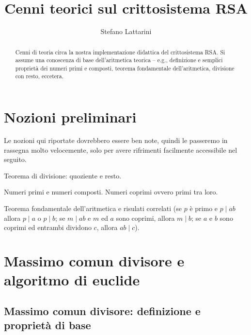 \documentclass[pdflatex,11pt,a4paper,oneside]{article}
\newcommand{\theauthor}[0]{Stefano Lattarini}
\newcommand{\thetitle}[0]{Cenni teorici sul crittosistema RSA}
\newcommand{\divides}[0]{\mid}
\begin{document}
\title{\thetitle}
\author{\theauthor}

\maketitle


\begin{abstract}
  Cenni di teoria circa la nostra implementazione didattica del
  crittosistema RSA.  Si assume una conoscenza di base dell'aritmetica
  teorica -- e.g., definizione e semplici propriet\`a dei numeri primi
  e composti, teorema fondamentale dell'aritmetica, divisione con resto,
  eccetera.
\end{abstract}


\section{Nozioni preliminari}

Le nozioni qui riportate dovrebbero essere ben note, quindi le
passeremo in rassegna molto velocemente, solo per avere rifrimenti
facilmente accessibile nel seguito.

Teorema di divisione: quoziente e resto.

Numeri primi e numeri composti.  Numeri coprimi ovvero primi tra loro.

Teorema fondamentale dell'aritmetica e risulati correlati (se $p$ \`e
primo e $p \divides ab$ allora $p \divides a$ o $p \divides b$; se
$m \divides ab$ e $m$ ed $a$ sono coprimi, allora $m \divides b$; se
$a$ e $b$ sono coprimi ed entrambi dividono $c$, allora $ab \divides c$).


\section{Massimo comun divisore e algoritmo di euclide}


\subsection{Massimo comun divisore: definizione e propriet\`a di base}
\end{document}
